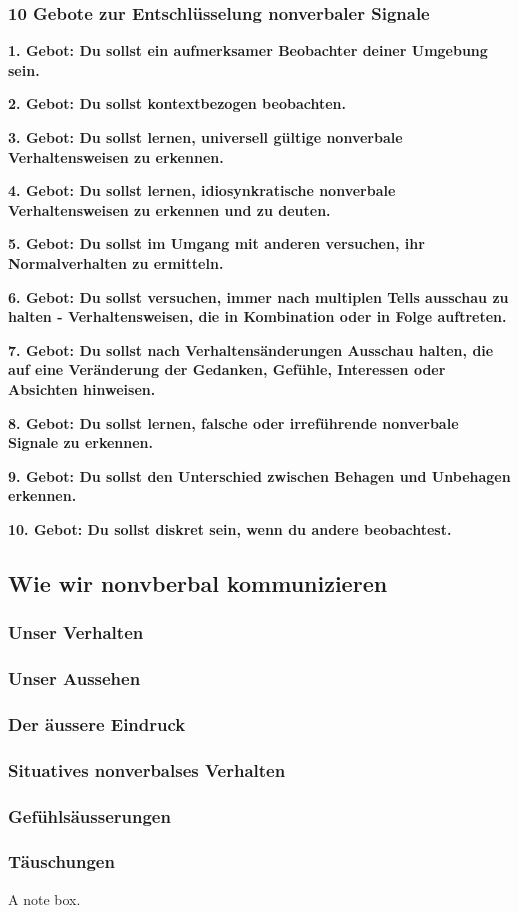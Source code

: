 \documentclass[
    invert-title=false,
    titlepage=true,
    titleimage-ratio=1011,
    parskip=half-,
]{bfhpub}                %
\begin{document}
    \subsubsection{10 Gebote zur Entschlüsselung nonverbaler Signale}
    \textbf{1. Gebot: Du sollst ein aufmerksamer Beobachter deiner Umgebung sein.}
    \par\textbf{2. Gebot: Du sollst kontextbezogen beobachten.}
    \par\textbf{3. Gebot: Du sollst lernen, universell gültige nonverbale Verhaltensweisen zu erkennen.}
    \par\textbf{4. Gebot: Du sollst lernen, idiosynkratische nonverbale Verhaltensweisen zu erkennen und zu deuten.}
    \par\textbf{5. Gebot: Du sollst im Umgang mit anderen versuchen, ihr Normalverhalten zu ermitteln.}
    \par\textbf{6. Gebot: Du sollst versuchen, immer nach multiplen Tells ausschau zu halten - Verhaltensweisen, die in Kombination oder in Folge auftreten.}
    \par\textbf{7. Gebot: Du sollst nach Verhaltensänderungen Ausschau halten, die auf eine Veränderung der Gedanken, Gefühle, Interessen oder Absichten hinweisen.}
    \par\textbf{8. Gebot: Du sollst lernen, falsche oder irreführende nonverbale Signale zu erkennen.}
    \par\textbf{9. Gebot: Du sollst den Unterschied zwischen Behagen und Unbehagen erkennen.}
    \par\textbf{10. Gebot: Du sollst diskret sein, wenn du andere beobachtest.}

    \subsection{Wie wir nonvberbal kommunizieren}

    \subsubsection{Unser Verhalten}

    \subsubsection{Unser Aussehen}

    \subsubsection{Der äussere Eindruck}

    \subsubsection{Situatives nonverbalses Verhalten}

    \subsubsection{Gefühlsäusserungen}

    \subsubsection{Täuschungen}


    \begin{bfhNoteBox}
        A note box.
    \end{bfhNoteBox}
\end{document}
